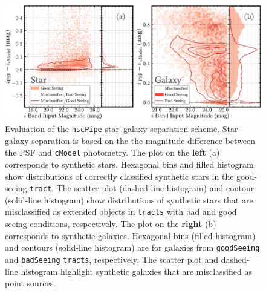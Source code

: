 \documentclass[useamsfonts]{pasj01}
\def\hscpipe{\texttt{hscPipe}}
\def\cmodel{\texttt{cModel}}
\def\tract{\texttt{tract}}
\def\tracts{\texttt{tracts}}
\begin{document}
\begin{figure}
    \begin{center}
        \includegraphics[width=\textwidth]{fig/synpipe_star_galaxy}
    \end{center}
    \caption{Evaluation of the \hscpipe{} star--galaxy separation scheme. 
        Star--galaxy separation is based on the the magnitude difference between the 
        PSF and \cmodel{} photometry. 
        The plot on the \textbf{left} (a) corresponds to synthetic stars. 
        Hexagonal bins and filled histogram show distributions of correctly classified
        synthetic stars in the good-seeing \tract{}.
        The scatter plot (dashed-line histogram) and contour (solid-line histogram)
        show distributions of synthetic stars that are misclassified as extended
        objects in \tracts{} with bad and good seeing conditions, respectively.
        The plot on the \textbf{right} (b) corresponds to synthetic galaxies.
        Hexagonal bins (filled histogram) and contours (solid-line histogram)
        are for galaxies from \texttt{goodSeeing} and \texttt{badSeeing} \tracts{},
        respectively.
        The scatter plot and dashed-line histogram highlight synthetic galaxies that 
        are misclassified as point sources.}
    \label{fig:sg}
\end{figure}
\end{document}
